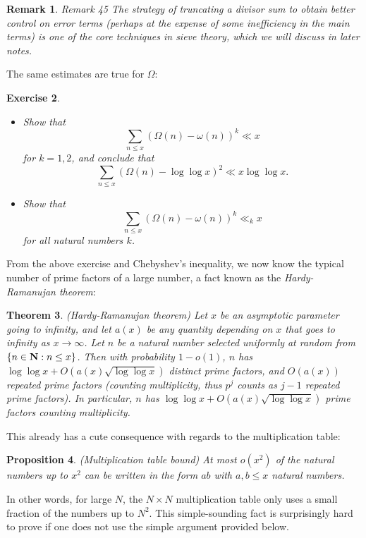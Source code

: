 \documentclass[10pt,reqno]{amsart}
\newtheorem{theorem}{Theorem}
\newtheorem{prop}[theorem]{Proposition}
\newtheorem{exercise}[theorem]{Exercise}
\newtheorem{remark}[theorem]{Remark}
\begin{document}
\begin{remark}
    Remark 45 The strategy of truncating a divisor sum to obtain better control on error terms (perhaps at the expense of some inefficiency in the main terms) is one of the core techniques in \emph{sieve theory}, which we will discuss in later notes.
\end{remark}

The same estimates are true for $\Omega$:

\begin{exercise} \
    \begin{itemize}
        \item[(i)] Show that
\[  \sum_{n \leq x} (\Omega(n) - \omega(n))^k \ll x\]
    for $k=1,2$, and conclude that
    \[  \sum_{n \leq x} (\Omega(n) - \log \log x)^2 \ll x \log\log x.\]

    \item[(ii)] Show that
    \[  \sum_{n \leq x} (\Omega(n) - \omega(n))^k \ll_k x\]
    for all natural numbers $k$.
    \end{itemize}
\end{exercise}

From the above exercise and Chebyshev’s inequality, we now know the typical number of prime factors of a large number, a fact known as the \emph{Hardy-Ramanujan theorem}:

\begin{theorem} (Hardy-Ramanujan theorem)
    Let $x$ be an asymptotic parameter going to infinity, and let $a(x)$ be any quantity depending on $x$ that goes to infinity as $x \rightarrow \infty$. Let $n$ be a natural number selected uniformly at random from $\{ n \in {\bf N}: n \leq x \}$. Then with probability $1-o(1)$, $n$ has $\log\log x + O( a(x) \sqrt{\log\log x} )$ distinct prime factors, and $O(a(x))$ repeated prime factors (counting multiplicity, thus $p^j$ counts as $j-1$ repeated prime factors). In particular, $n$ has $\log\log x + O(a(x) \sqrt{\log\log x})$ prime factors counting multiplicity.
\end{theorem}

This already has a cute consequence with regards to the multiplication table:

\begin{prop} (Multiplication table bound) At most $o(x^2)$ of the natural numbers up to $x^2$ can be written in the form $ab$ with $a,b \leq x$ natural numbers.
\end{prop}

In other words, for large $N$, the $N \times N$ multiplication table only uses a small fraction of the numbers up to $N^2$. This simple-sounding fact is surprisingly hard to prove if one does not use the simple argument provided below.
\end{document}
